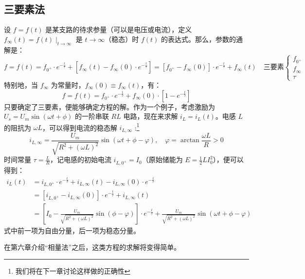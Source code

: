 \documentclass[UTF8]{report}
\theoremstyle{MyLineTheoremStyle} %
\theoremstyle{MyBlockTheoremStyle} %
\theoremstyle{MySubsubsectionStyle} %
\begin{document}
\subsection{三要素法}
设 $f = f(t)$ 是某支路的待求参量（可以是电压或电流），定义 $f_{\infty}(t) = f(t)\mid_{t \to \infty}$ 是 $t \to \infty$（稳态）时 $f(t)$ 的表达式。那么，参数的通解是：
\begin{equation}
\boxed{
    f = f(t) = f_{0^+}\cdot e^{-\frac{t}{\tau}} + \left[ f_{\infty}(t) - f_{\infty}(0)\cdot e^{-\frac{t}{\tau}} \right] = \left[f_{0^+} - f_{\infty}(0)\right]\cdot e^{-\frac{t}{\tau}} + f_{\infty}(t)
}\quad 
\text{三要素}
\begin{cases}
    f_{0^+} \\ 
    f_{\infty} \\ 
    \tau
\end{cases}
\end{equation}
特别地，当 $f_{\infty}$ 为常量时，$f_{\infty}(0) \equiv f_{\infty}(t)$，有：
\begin{equation}
\boxed{
    f = f(t) = f_{0^+}\cdot e^{-\frac{t}{\tau}} + f_{\infty}(0)\cdot \left[ 1 - e^{-\frac{t}{\tau}} \right]
}
\end{equation}
只要确定了三要素，便能够确定方程的解。作为一个例子，考虑激励为 $U_s = U_m \sin (\omega t + \phi)$ 的一阶串联 $RL$ 电路，现在来求解 $i_L = i_L(t)$。电感 $L$ 的阻抗为 $\omega L$，可以得到电流的稳态解 $i_{L,\infty}$ :\footnote{我们将在下一章讨论这样做的正确性}
\begin{equation}
i_{L, \infty} = \frac{U_m}{\sqrt{R^2 + (\omega L)^2}} \sin \left(\omega t + \phi - \varphi \right),\quad \varphi =  \arctan \frac{\omega L}{R} > 0
\end{equation}
时间常量 $\tau = \frac{L}{R}$，记电感的初始电流 $i_{L,0^+} = I_0 $（原始储能为 $E = \frac{1}{2}LI_0^2$），便可以得到：
\begin{align}
i_L(t) &= i_{L,0^+} \cdot e^{-\frac{t}{\tau}} + i_{L, \infty}(t) -  i_{L, \infty}(0)\cdot e^{-\frac{t}{\tau}} \\
&= \left[i_{L,0^+} - i_{L, \infty}(0)\right] \cdot e^{-\frac{t}{\tau}} + i_{L, \infty}(t)\\
&= 
\left[I_0 - \frac{U_m}{\sqrt{R^2 + (\omega L)^2}} \sin \left(\phi - \varphi \right) \right] \cdot e^{-\frac{t}{\tau}}
+ \frac{U_m}{\sqrt{R^2 + (\omega L)^2}} \sin \left(\omega t + \phi - \varphi \right)
\end{align}
式中前一项为自由分量，后一项为稳态分量。

在第六章介绍“相量法”之后，这类方程的求解将变得简单。
\end{document}
